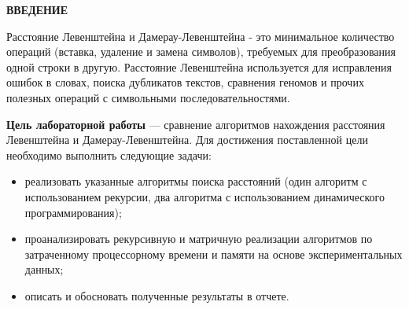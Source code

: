 \begin{center}
    \textbf{ВВЕДЕНИЕ}
\end{center}


Расстояние Левенштейна и Дамерау-Левенштейна - это минимальное количество операций (вставка, удаление и замена символов), требуемых для преобразования одной строки в другую. Расстояние Левенштейна используется для исправления ошибок в словах, поиска дубликатов текстов, сравнения геномов и прочих полезных операций с символьными последовательностями.


\textbf{Цель лабораторной работы} ---  сравнение алгоритмов нахождения расстояния Левенштейна и Дамерау-Левенштейна. Для достижения поставленной цели необходимо выполнить следующие задачи:

\begin{itemize}
	\item реализовать указанные алгоритмы поиска расстояний (один алгоритм с использованием рекурсии, два алгоритма с использованием динамического программирования);
	\item проанализировать рекурсивную и матричную реализации алгоритмов по затраченному процессорному времени и памяти на основе экспериментальных данных;
	\item описать и обосновать полученные результаты в отчете.
\end{itemize}
